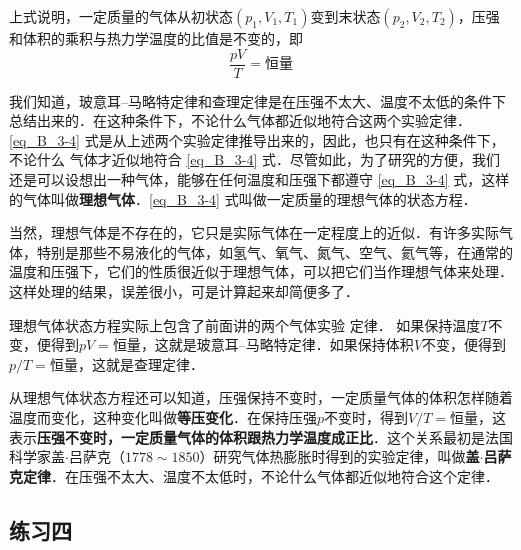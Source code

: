 上式说明，一定质量的气体从初状态$(p_1,V_1,T_1)$变到末状态$(p_2,V_2,T_2)$，压强和体积的乘积与热力学温度的比值是不变的，即
\begin{equation}\label{eq_B_3-4}
\frac{pV}{T}=\text{恒量}
\end{equation}

我们知道，玻意耳--马略特定律和查理定律是在压强不太大、温度不太低的条件下总结出来的．在这种条件下，不论什么气体都近似地符合这两个实验定律．\eqref{eq_B_3-4} 式是从上述两个实验定律推导出来的，因此，也只有在这种条件下，不论什么
气体才近似地符合 \eqref{eq_B_3-4} 式．尽管如此，为了研究的方便，我们还是可以设想出一种气体，能够在任何温度和压强下都遵守 \eqref{eq_B_3-4}  式，这样的气体叫做\textbf{理想气体}．\eqref{eq_B_3-4} 式叫做一定质量的理想气体的状态方程．

当然，理想气体是不存在的，它只是实际气体在一定程度上的近似．有许多实际气体，特别是那些不易液化的气体，如氢气、氧气、氮气、空气、氦气等，在通常的温度和压强下，它们的性质很近似于理想气体，可以把它们当作理想气体来处理．这样处理的结果，误差很小，可是计算起来却简便多了．

理想气体状态方程实际上包含了前面讲的两个气体实验
定律．
如果保持温度$T$不变，便得到$pV=\text{恒量}$，这就是玻意耳--马略特定律．如果保持体积$V$不变，便得到$p/T=\text{恒量}$，这就是查理定律．

从理想气体状态方程还可以知道，压强保持不变时，一定质量气体的体积怎样随着温度而变化，这种变化叫做\textbf{等压变化}．在保持压强$p$不变时，得到$V/T=\text{恒量}$，这表示\textbf{压强不变时，一定质量气体的体积跟热力学温度成正比}．这个关系最初是法国科学家盖$\cdot$吕萨克（$1778 \sim 1850$）研究气体热膨胀时得到的实验定律，叫做\textbf{盖$\cdot$吕萨克定律}．在压强不太大、温度不太低时，不论什么气体都近似地符合这个定律．


\subsection*{练习四}

